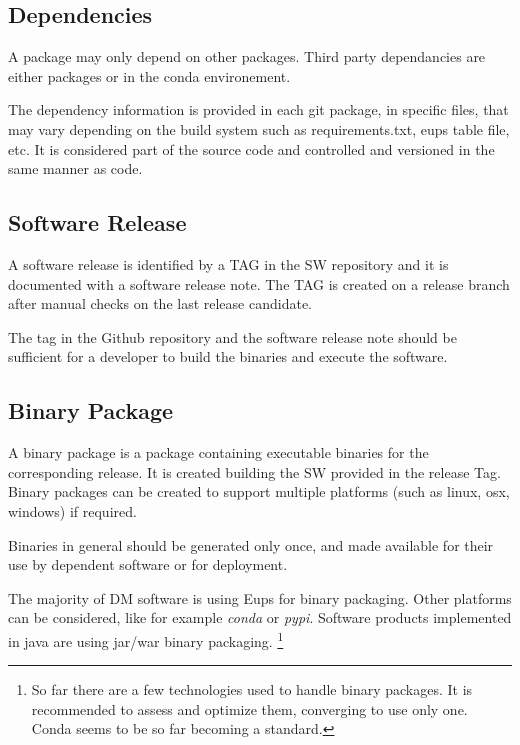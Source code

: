 \subsection{Dependencies} \label{sect:dependencies}


A package may only depend on other packages. Third party dependancies are either packages or in the conda environement.

The dependency information is provided in each git package, in specific files, that may vary depending on the build system such as requirements.txt, eups table file, etc.
It is considered part of the source code and controlled  and versioned in the same manner as code.


\subsection{Software Release} \label{sect:swrel}

A software release is identified by a TAG in the SW repository and it is documented with a software release note.
The TAG is created on a release branch after manual checks on the last release candidate.

The tag in the Github repository and the software release note should be sufficient for a developer
to build the binaries and execute the software.



\subsection{Binary Package} \label{sect:swbpkg}

A binary package is a package containing executable binaries for the corresponding release.
It is created building the SW provided in the release Tag.
Binary packages can be created to support multiple platforms (such as linux, osx, windows) if required.

Binaries in general should be generated only once, and made available for their use by dependent software or for deployment.

The majority of DM software is using Eups for binary packaging. Other platforms can be considered, like for example \textit{conda} or \textit{pypi}.
Software products implemented in java are using jar/war binary packaging.
\footnote{So far there are a few technologies used to handle binary packages. It is recommended to assess and optimize them, converging to use only one.
Conda seems to be so far becoming a standard.}

